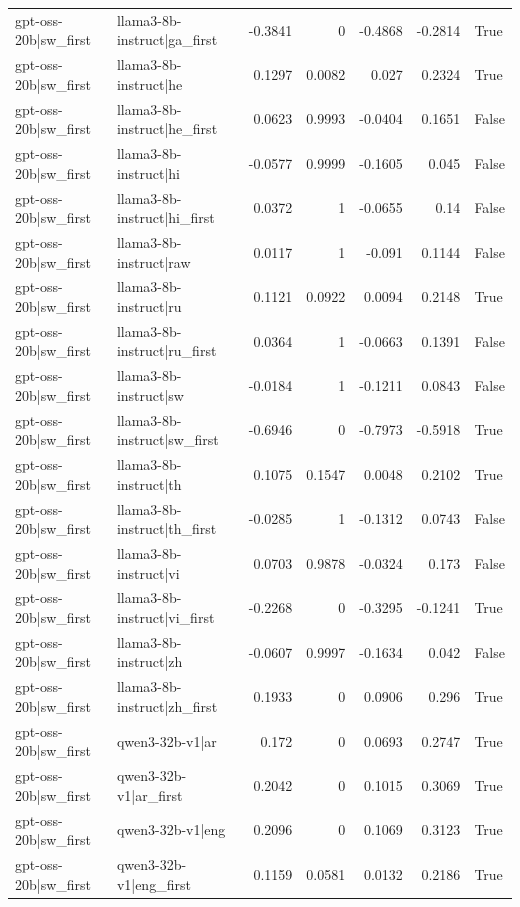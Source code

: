 \begin{table}
\begin{tabular}{l l r r r r l}
gpt-oss-20b|sw_first & llama3-8b-instruct|ga_first & -0.3841 & 0 & -0.4868 & -0.2814 & True \\
gpt-oss-20b|sw_first & llama3-8b-instruct|he & 0.1297 & 0.0082 & 0.027 & 0.2324 & True \\
gpt-oss-20b|sw_first & llama3-8b-instruct|he_first & 0.0623 & 0.9993 & -0.0404 & 0.1651 & False \\
gpt-oss-20b|sw_first & llama3-8b-instruct|hi & -0.0577 & 0.9999 & -0.1605 & 0.045 & False \\
gpt-oss-20b|sw_first & llama3-8b-instruct|hi_first & 0.0372 & 1 & -0.0655 & 0.14 & False \\
gpt-oss-20b|sw_first & llama3-8b-instruct|raw & 0.0117 & 1 & -0.091 & 0.1144 & False \\
gpt-oss-20b|sw_first & llama3-8b-instruct|ru & 0.1121 & 0.0922 & 0.0094 & 0.2148 & True \\
gpt-oss-20b|sw_first & llama3-8b-instruct|ru_first & 0.0364 & 1 & -0.0663 & 0.1391 & False \\
gpt-oss-20b|sw_first & llama3-8b-instruct|sw & -0.0184 & 1 & -0.1211 & 0.0843 & False \\
gpt-oss-20b|sw_first & llama3-8b-instruct|sw_first & -0.6946 & 0 & -0.7973 & -0.5918 & True \\
gpt-oss-20b|sw_first & llama3-8b-instruct|th & 0.1075 & 0.1547 & 0.0048 & 0.2102 & True \\
gpt-oss-20b|sw_first & llama3-8b-instruct|th_first & -0.0285 & 1 & -0.1312 & 0.0743 & False \\
gpt-oss-20b|sw_first & llama3-8b-instruct|vi & 0.0703 & 0.9878 & -0.0324 & 0.173 & False \\
gpt-oss-20b|sw_first & llama3-8b-instruct|vi_first & -0.2268 & 0 & -0.3295 & -0.1241 & True \\
gpt-oss-20b|sw_first & llama3-8b-instruct|zh & -0.0607 & 0.9997 & -0.1634 & 0.042 & False \\
gpt-oss-20b|sw_first & llama3-8b-instruct|zh_first & 0.1933 & 0 & 0.0906 & 0.296 & True \\
gpt-oss-20b|sw_first & qwen3-32b-v1|ar & 0.172 & 0 & 0.0693 & 0.2747 & True \\
gpt-oss-20b|sw_first & qwen3-32b-v1|ar_first & 0.2042 & 0 & 0.1015 & 0.3069 & True \\
gpt-oss-20b|sw_first & qwen3-32b-v1|eng & 0.2096 & 0 & 0.1069 & 0.3123 & True \\
gpt-oss-20b|sw_first & qwen3-32b-v1|eng_first & 0.1159 & 0.0581 & 0.0132 & 0.2186 & True \\

\end{tabular}
\end{table}
